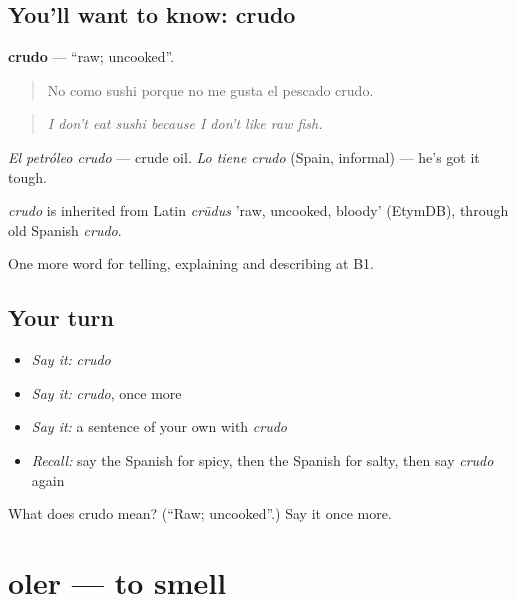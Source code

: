 \subsection*{You'll want to know: crudo}
\textbf{crudo} — \textquotedblleft{}raw; uncooked\textquotedblright{}.

\begin{quote}
No como sushi porque no me gusta el pescado crudo.
\end{quote}

\begin{quote}
\emph{I don't eat sushi because I don't like raw fish.}
\end{quote}

\emph{El petróleo crudo} — crude oil. \emph{Lo tiene crudo} (Spain, informal) — he's got it tough.

\begin{cousinweb}
\emph{crudo} is inherited from Latin \emph{crūdus} 'raw, uncooked, bloody' (EtymDB), through old Spanish \emph{crudo}.
\end{cousinweb}

\begin{grammarlens}[title={What you've built}]
One more word for telling, explaining and describing at B1.
\end{grammarlens}

\subsection*{Your turn}
\begin{itemize}
\raggedright
  \item \emph{Say it:} \emph{crudo}
  \item \emph{Say it:} \emph{crudo}, once more
  \item \emph{Say it:} a sentence of your own with \emph{crudo}
  \item \emph{Recall:} say the Spanish for spicy, then the Spanish for salty, then say \emph{crudo} again
\end{itemize}

\begin{tcolorbox}[breakable,colback=teal!4,colframe=teal!35!black,title={Before you move on}]
What does crudo mean? (\textquotedblleft{}Raw; uncooked\textquotedblright{}.) Say it once more.
\end{tcolorbox}
\section[oler]{oler — to smell}

